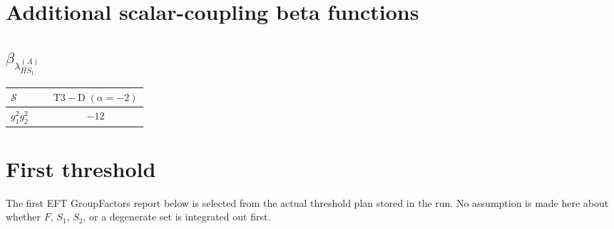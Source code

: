 \documentclass[9pt]{article}
\begin{document}
\section*{Additional scalar-coupling beta functions}
\subsection*{$ \beta_{\lambda_{HS_1}^{(A)}} $}
\begin{longtable}{@{}p{0.31\linewidth}c@{}}
\toprule
$\mathcal{S}$ & $ \mathrm{T3-D}\;(\alpha=-2) $ \\
\midrule
$ g_1^2g_2^2 $ & $ -12 $ \\
\bottomrule
\end{longtable}
\section*{First threshold}
The first EFT GroupFactors report below is selected from the actual threshold plan stored in the run.  No assumption is made here about whether $F$, $S_1$, $S_2$, or a degenerate set is integrated out first.
\end{document}
